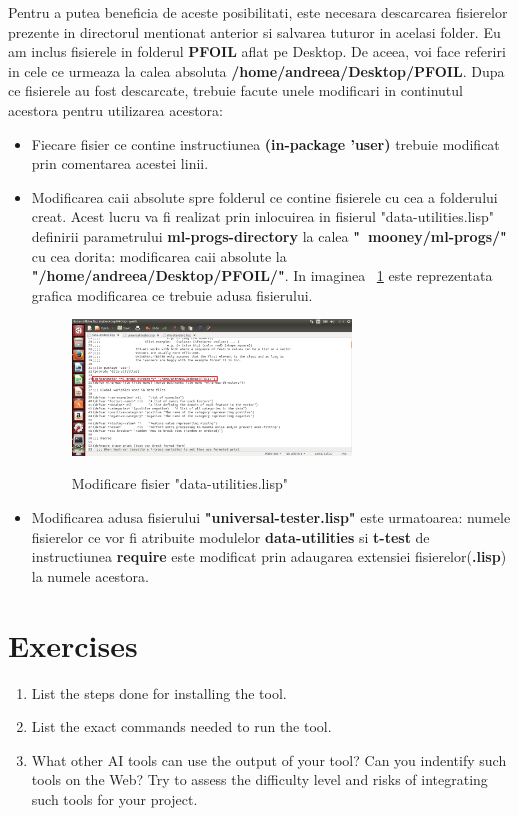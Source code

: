 \documentclass[a4paper,12pt]{report}
\begin{document}
	Pentru a putea beneficia de aceste posibilitati, este necesara descarcarea fisierelor prezente in directorul mentionat anterior si salvarea tuturor in acelasi folder. Eu am inclus fisierele in folderul \textbf{PFOIL} aflat pe Desktop. De aceea, voi face referiri in cele ce urmeaza la calea absoluta \textbf{/home/andreea/Desktop/PFOIL}.
	Dupa ce fisierele au fost descarcate, trebuie facute unele modificari in continutul acestora pentru utilizarea acestora:
\begin{itemize}
\item Fiecare fisier ce contine instructiunea \textbf{(in-package 'user)} trebuie modificat prin comentarea acestei linii.
\item Modificarea caii absolute spre folderul ce contine fisierele cu cea a folderului creat. Acest lucru va fi realizat prin inlocuirea in fisierul "data-utilities.lisp" definirii parametrului \textbf{ml-progs-directory} la calea \textbf{"~mooney/ml-progs/"} cu cea dorita: modificarea caii absolute la \textbf{"/home/andreea/Desktop/PFOIL/"}. In imaginea ~\ref{fig:img1} este reprezentata grafica modificarea ce trebuie adusa fisierului.
\begin{figure}[h]
			\centering
			\caption{Modificare fisier "data-utilities.lisp"}
			\label{fig:img1}
			\includegraphics[width=0.7\textwidth]{fig/img1}\\
\end{figure}
\item Modificarea adusa fisierului \textbf{"universal-tester.lisp"} este urmatoarea: numele fisierelor ce vor fi atribuite modulelor \textbf{data-utilities} si \textbf{t-test} de instructiunea \textbf{require} este modificat prin adaugarea extensiei fisierelor(\textbf{.lisp}) la numele acestora.
\end{itemize}	

\section{Exercises}
\begin{enumerate}
 \item List the steps done for installing the tool. 
 \item List the exact commands needed to run the tool. 
 \item What other AI tools can use the output of your tool? 
 Can you indentify such tools on the Web?
 Try to assess the difficulty level and risks of integrating such tools for your project.
\end{enumerate}
\end{document}
